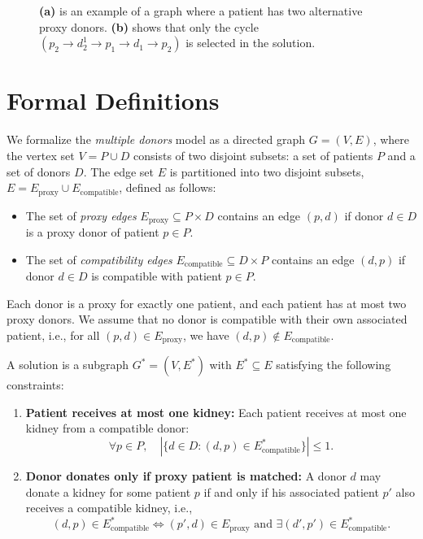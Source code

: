 \begin{figure}[htbp]
\begin{minipage}[t]{0.48\textwidth}
    \caption[An example of a graph with a patient having two alternative donors]{\textbf{(a)} is an example of a graph where a patient has two alternative proxy donors. \textbf{(b)} shows that only the cycle $(p_2 \rightarrow d_2^1 \rightarrow p_1 \rightarrow d_1 \rightarrow p_2)$ is selected in the solution.}
    \label{fig:alternative_model_example}
  \end{minipage}
\end{figure}

\section{Formal Definitions}

We formalize the \textit{multiple donors} model as a directed graph $G = (V, E)$, where the vertex set $V = P \cup D$ consists of two disjoint subsets: a set of patients $P$ and a set of donors $D$. The edge set $E$ is partitioned into two disjoint subsets, $E = E_{\mathrm{proxy}} \cup E_{\mathrm{compatible}}$, defined as follows:
\begin{itemize}
    \item The set of \textit{proxy edges} $E_{\mathrm{proxy}} \subseteq P \times D$ contains an edge $(p, d)$ if donor $d \in D$ is a proxy donor of patient $p \in P$.
    \item The set of \textit{compatibility edges} $E_{\mathrm{compatible}} \subseteq D \times P$ contains an edge $(d, p)$ if donor $d \in D$ is compatible with patient $p \in P$.
\end{itemize}

Each donor is a proxy for exactly one patient, and each patient has at most two proxy donors. We assume that no donor is compatible with their own associated patient, i.e., for all $(p, d) \in E_{\mathrm{proxy}}$, we have $(d, p) \notin E_{\mathrm{compatible}}$.

A solution is a subgraph $G^{\mathrm{*}} = (V, E^{\mathrm{*}})$ with $E^{\mathrm{*}} \subseteq E$ satisfying the following constraints:
\begin{enumerate}
    \item \textbf{Patient receives at most one kidney:}  
    Each patient receives at most one kidney from a compatible donor:  
    \[
        \forall p \in P, \quad \left| \{ d \in D : (d, p) \in E^{\mathrm{*}}_{\mathrm{compatible}} \} \right| \le 1.
    \]
    \item \textbf{Donor donates only if proxy patient is matched:}  
    A donor $d$ may donate a kidney for some patient $p$ if and only if his associated patient $p'$ also receives a compatible kidney, i.e.,  
    \[
        (d, p) \in E^{\mathrm{*}}_{\mathrm{compatible}} \iff (p', d) \in E_{\mathrm{proxy}} \text{ and } \exists (d', p') \in E^{\mathrm{*}}_{\mathrm{compatible}}.
    \]
\end{enumerate}

